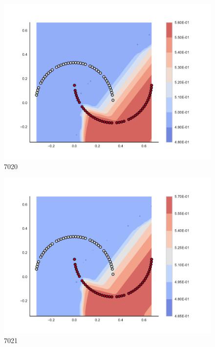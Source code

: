 \begin{subfigure}[b]{0.09\textwidth}
    \includegraphics[clip, trim=2.35cm 1.75cm 4.5cm 0cm,width=\textwidth]{img/convergence/7020.pdf}
    \caption{7020}
    \label{fig:convergence_7020}
\end{subfigure}
%
\begin{subfigure}[b]{0.09\textwidth}
    \includegraphics[clip, trim=2.35cm 1.75cm 4.5cm 0cm,width=\textwidth]{img/convergence/7021.pdf}
    \caption{7021}
    \label{fig:convergence_7021}
\end{subfigure}
%

